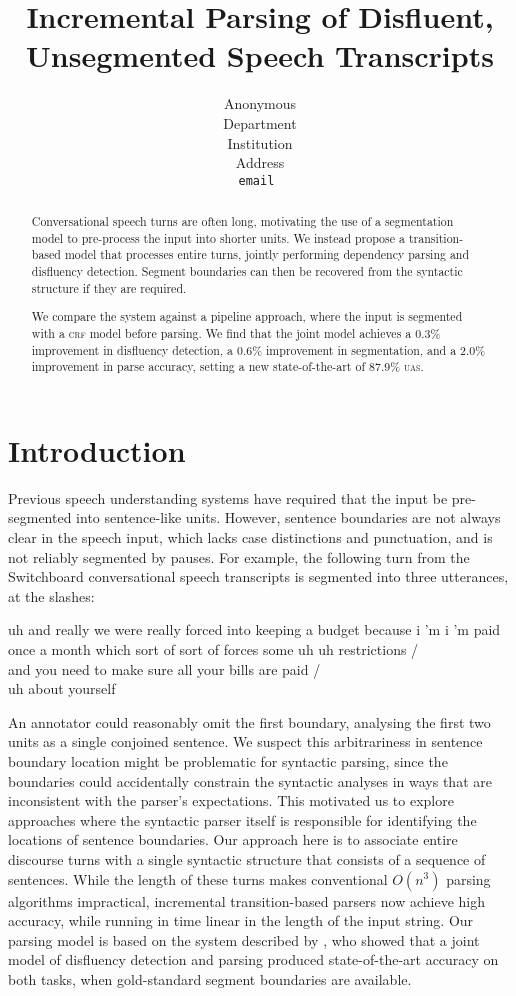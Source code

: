 \documentclass[11pt,letterpaper]{article}
\title{Incremental Parsing of Disfluent, Unsegmented Speech Transcripts}
\author{
	Anonymous\\
  	Department\\
  	Institution\\
  	Address\\
  {\tt \small email }\\
}
\date{}
\begin{document}
\maketitle
\begin{abstract}
Conversational speech turns are often long, motivating the use of a segmentation
model to pre-process the input into shorter units.  We instead propose a
transition-based model that processes entire turns, jointly performing dependency
parsing and disfluency detection.  Segment boundaries can then be recovered
from the syntactic structure if they are required.

We compare the system against a pipeline approach, where the input is segmented
with a \textsc{crf} model before parsing.  We find that the joint model achieves
a 0.3\% improvement in disfluency detection, a 0.6\% improvement in segmentation,
and a 2.0\% improvement in parse accuracy, setting a new state-of-the-art of
87.9\% \textsc{uas}.
\end{abstract}

\section{Introduction}


Previous speech understanding systems have required that the input be
pre-segmented into sentence-like units.  However, sentence boundaries are not
always clear in the speech input, which lacks case distinctions and punctuation,
and is not reliably segmented by pauses.
For example, the following turn from the
Switchboard conversational speech transcripts is segmented into three utterances,
at the slashes:

\begin{lexample}
\small
uh and really we were really forced into keeping a budget because i 'm i 'm paid
once a month which sort of sort of forces some uh uh restrictions / \\
and you need to make sure all your bills are paid / \\
uh about yourself
\end{lexample}

\noindent An annotator could reasonably omit the first boundary, analysing
the first two units as a single conjoined sentence.  
We suspect this arbitrariness in sentence boundary location
might be problematic for syntactic parsing, since the boundaries could
accidentally constrain the syntactic analyses in ways that are inconsistent with
the parser's expectations.  This motivated us to explore approaches where the
syntactic parser itself is responsible for identifying the locations of sentence
boundaries.  Our approach here is to associate entire discourse turns with a
single syntactic structure that consists of a sequence of sentences.
While the length of these turns makes conventional $O(n^3)$ parsing algorithms
impractical, incremental transition-based parsers now achieve high accuracy,
while running in time linear in the length of the input string.
Our parsing model is based on the system described
by \citet{honnibal:14}, who showed that a joint model of disfluency detection
and parsing produced state-of-the-art accuracy on both tasks, when gold-standard
segment boundaries are available.
\end{document}

